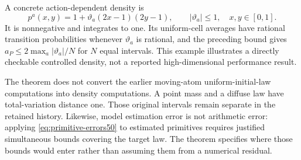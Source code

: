 A concrete action-dependent density is
\[
 p^a(x,y)=1+\vartheta_a(2x-1)(2y-1),\qquad |\vartheta_a|\le1,
 \quad x,y\in[0,1].
\]
It is nonnegative and integrates to one. Its uniform-cell averages have rational transition probabilities whenever $\vartheta_a$ is rational, and the preceding bound gives $a_P\le2\max_a|\vartheta_a|/N$ for $N$ equal intervals. This example illustrates a directly checkable controlled density, not a reported high-dimensional performance result.

The theorem does not convert the earlier moving-atom uniform-initial-law computations into density computations. A point mass and a diffuse law have total-variation distance one. Those original intervals remain separate in the retained history. Likewise, model estimation error is not arithmetic error: applying \eqref{eq:primitive-errors50} to estimated primitives requires justified simultaneous bounds covering the target law. The theorem specifies where those bounds would enter rather than assuming them from a numerical residual.
